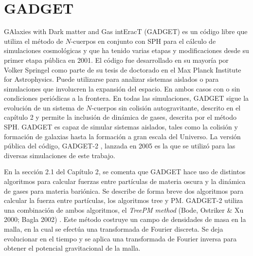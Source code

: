 \documentclass[a4paper,openright,12pt]{book}
\begin{document}
\chapter{GADGET}\label{GADGET}
GAlaxies with Dark matter and Gas intEracT (GADGET) es un código libre que utiliza el método de $N$-cuerpos en conjunto con SPH para el cálculo de simulaciones cosmológicas y que ha tenido varias etapas y modificaciones desde su primer etapa pública en 2001. El código fue desarrollado en su mayoría por Volker Springel \cite{b4} como parte de su tesis de doctorado en el Max Planck Institute for Astrophysics. Puede utilizarse para analizar sistemas aislados o para simulaciones que involucren la expansión del espacio. En ambos casos con o sin condiciones periódicas a la frontera. En todas las simulaciones, GADGET sigue la evolución de un sistema de $N$-cuerpos sin colisión autogravitante, descrito en el capítulo 2 y permite la inclusión de dinámica de gases, descrita por el método SPH.
GADGET es capaz de simular sistemas aislados, tales como la colisión y formación de galaxias hasta la formación a gran escala del Universo. La versión pública del código, GADGET-2 \cite{b10}, lanzada en 2005 es la que se utilizó para las diversas simulaciones de este trabajo.

En la sección 2.1 del Capítulo 2, se comenta que GADGET hace uso de distintos algoritmos para calcular fuerzas entre partículas de materia oscura y la dinámica de gases para materia bariónica. Se describe de forma breve dos algoritmos para calcular la fuerza entre partículas, los algoritmos tree y PM. GADGET-2 utiliza una combinación de ambos algoritmos, el \textit{TreePM method} (Bode, Ostriker \& Xu 2000; Bagla 2002) \cite{3.0.1, 3.0.2}. Este método costruye un campo de densidades de masa en la malla, en la cual se efectúa una transformada de Fourier discreta. Se deja evolucionar en el tiempo y se aplica una transformada de Fourier inversa para obtener el potencial gravitacional de la malla.
\end{document}
